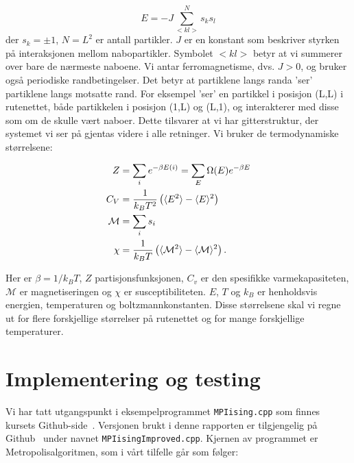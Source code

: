 \documentclass[11pt]{article}
\begin{document}
\begin{equation}
  E=-J\sum_{<kl>}^{N}s_ks_l\label{eq:energi}
\end{equation}
der  $s_k=\pm 1$, $N = L^2$ er antall partikler.
$J$ er en konstant som beskriver styrken på interaksjonen mellom
nabopartikler. Symbolet $<kl>$ betyr at vi summerer over bare de
nærmeste naboene. Vi antar ferromagnetisme, dvs.  $J> 0$, og bruker også
periodiske randbetingelser. Det betyr at partiklene langs randa 'ser' 
partiklene langs motsatte rand. For eksempel 'ser' en partikkel i posisjon
(L,L) i rutenettet, både partikkelen i posisjon (1,L) og (L,1), og interakterer
med disse som om de skulle vært naboer. Dette tilsvarer at vi har
gitterstruktur, der systemet vi ser på gjentas videre i alle
retninger. Vi bruker de termodynamiske størrelsene:

\begin{align}
Z &= \sum_i e^{-\beta E(i)} = \sum_E \Omega(E) e^{-\beta E}\label{eq:partisjons-funk} \\
C_V &= \frac{ 1 }{ k_B T^2} \left( \langle E^2 \rangle-\langle E \rangle^2 \right)\label{eq:spesifikk-varmekapasitet} \\
\mathcal{M} &= \sum_i s_i\label{eq:magnetisering} \\
\chi &= \frac{ 1 }{ k_BT } \left( \langle \mathcal{M}^2 \rangle - \langle \mathcal{M} \rangle^2 \right)\label{eq:susceptibilitet}.
\end{align}

Her er $\beta = 1/k_BT$, $Z$ partisjonsfunksjonen, $C_v$ er den spesifikke varmekapasiteten,
$\mathcal{M}$ er magnetiseringen og $\chi$ er susceptibiliteten. $E$, $T$ og $k_B$ er henholdsvis 
energien, temperaturen og boltzmannkonstanten. Disse størrelsene skal vi regne ut for flere forskjellige
størrelser på rutenettet og for mange forskjellige temperaturer.


\section{Implementering og testing}

Vi har tatt utgangspunkt i eksempelprogrammet \texttt{MPIising.cpp}
som finnes kursets Github-side~\cite{compphys-github}. Versjonen brukt
i denne rapporten er tilgjengelig på Github~\cite{github-repo} under navnet \texttt{MPIisingImproved.cpp}. Kjernen av
programmet er Metropolisalgoritmen, som i vårt tilfelle går som følger: 
\end{document}
